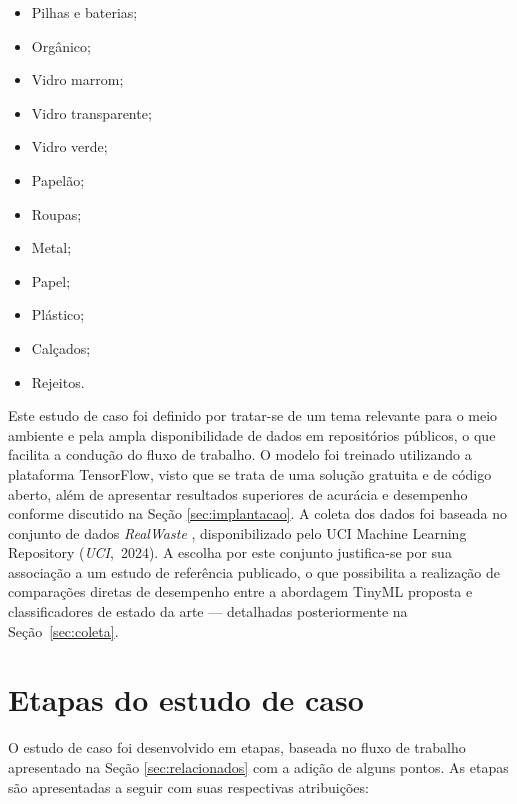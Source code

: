 \documentclass[repeatfields,xlists,xpacks,oneside]{ufrgscca}
\begin{document}
\begin{itemize}
    \item Pilhas e baterias;
    \item Orgânico;
    \item Vidro marrom;
    \item Vidro transparente;
    \item Vidro verde;
    \item Papelão;
    \item Roupas;
    \item Metal;
    \item Papel;
    \item Plástico;
    \item Calçados;
    \item Rejeitos.
\end{itemize}

Este estudo de caso foi definido por tratar-se de um tema relevante para o meio ambiente e pela ampla disponibilidade de dados em repositórios públicos, o que facilita a condução do fluxo de trabalho. O modelo foi treinado utilizando a plataforma TensorFlow, visto que se trata de uma solução gratuita e de código aberto, além de apresentar resultados superiores de acurácia e desempenho conforme discutido na Seção \ref{sec:implantacao}. A coleta dos dados foi baseada no conjunto de dados \textit{RealWaste} \cite{realwaste2023}, disponibilizado pelo UCI Machine Learning Repository (\textit{UCI},~2024). A escolha por este conjunto justifica-se por sua associação a um estudo de referência publicado, o que possibilita a realização de comparações diretas de desempenho entre a abordagem TinyML proposta e classificadores de estado da arte — detalhadas posteriormente na Seção~\ref{sec:coleta}.

\section{Etapas do estudo de caso}
O estudo de caso foi desenvolvido em etapas, baseada no fluxo de trabalho apresentado na Seção \ref{sec:relacionados} com a adição de alguns pontos. As etapas são apresentadas a seguir com suas respectivas atribuições:
\end{document}
